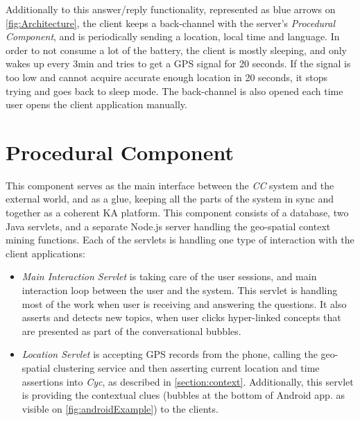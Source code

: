 Additionally to this answer/reply functionality, represented as blue arrows on
\autoref{fig:Architecture}, the client keeps a back-channel with the 
server's \emph{Procedural Component}, and is periodically sending a location,
local time and language. In order to not consume a lot of the battery, the 
client is mostly sleeping, and only wakes up every 3min and tries to get a GPS
signal for 20 seconds. If the signal is too low and cannot acquire accurate 
enough location in 20 seconds, it stops trying and goes back to sleep mode.
The back-channel is also opened each time user opens the client application
manually.

\section{Procedural Component}
\label{section:prophet}
This component serves as the main interface between the \emph{CC} system and
the external world, and as a glue, keeping all the parts of the system in sync
and together as a coherent KA platform. This component consists of a database,
two Java servlets, and a separate Node.js server handling the geo-spatial 
context mining functions. Each of the servlets is handling one type of 
interaction with the client applications:
\begin{itemize}
\item \emph{Main Interaction Servlet} is taking care of the user sessions, and 
main interaction loop between the user and the system. This servlet is handling
most of the work when user is receiving and answering the questions. It also
asserts and detects new topics, when user clicks hyper-linked concepts that
are presented as part of the conversational bubbles.
\item \emph{Location Servlet} is accepting GPS records from the phone, calling
the geo-spatial clustering service and then asserting current location and 
time assertions into \emph{Cyc}, as described in \autoref{section:context}.
Additionally, this servlet is providing the contextual clues (bubbles at the
bottom of Android app. as visible on \autoref{fig:androidExample}) to the 
clients.
\end{itemize}

